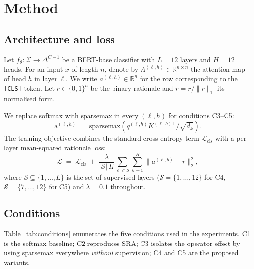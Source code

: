 \documentclass{article}
\begin{document}
\section{Method}
\label{sec:method}

\subsection{Architecture and loss}

Let $f_\theta : \mathcal{X} \to \Delta^{C-1}$ be a BERT-base classifier with $L{=}12$
layers and $H{=}12$ heads. For an input $x$ of length $n$, denote by
$A^{(\ell,h)} \in \mathbb{R}^{n\times n}$ the attention map of head $h$ in layer $\ell$.
We write $a^{(\ell,h)} \in \mathbb{R}^n$ for the row corresponding to the
\texttt{[CLS]} token. Let $r \in \{0,1\}^n$ be the binary rationale and
$\bar r = r / \|r\|_1$ its normalised form.

We replace softmax with sparsemax in every $(\ell,h)$ for conditions C3--C5:
\begin{equation}
a^{(\ell,h)} \;=\; \mathrm{sparsemax}\!\left( q^{(\ell,h)} K^{(\ell,h)\top} / \sqrt{d_k} \right).
\end{equation}
The training objective combines the standard cross-entropy term $\mathcal{L}_{\mathrm{cls}}$
with a per-layer mean-squared rationale loss:
\begin{equation}
\mathcal{L} \;=\; \mathcal{L}_{\mathrm{cls}}
\;+\; \frac{\lambda}{|\mathcal{S}|\,H} \sum_{\ell \in \mathcal{S}} \sum_{h=1}^{H}
\big\| a^{(\ell,h)} - \bar r \big\|_2^{2},
\label{eq:loss}
\end{equation}
where $\mathcal{S} \subseteq \{1,\dots,L\}$ is the set of supervised layers
($\mathcal{S}=\{1,\dots,12\}$ for C4, $\mathcal{S}=\{7,\dots,12\}$ for C5) and
$\lambda{=}0.1$ throughout.

\subsection{Conditions}

Table~\ref{tab:conditions} enumerates the five conditions used in the experiments. C1 is
the softmax baseline; C2 reproduces SRA; C3 isolates the operator effect by using
sparsemax everywhere \emph{without} supervision; C4 and C5 are the proposed variants.
\end{document}
